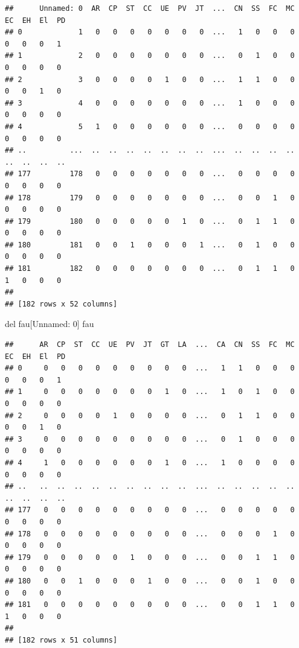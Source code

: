 \documentclass[
  10pt,
]{article}
\newenvironment{Shaded}{\begin{snugshade}}{\end{snugshade}}
\newcommand{\NormalTok}[1]{#1}
\begin{document}
\begin{verbatim}
##      Unnamed: 0  AR  CP  ST  CC  UE  PV  JT  ...  CN  SS  FC  MC  EC  EH  El  PD
## 0             1   0   0   0   0   0   0   0  ...   1   0   0   0   0   0   0   1
## 1             2   0   0   0   0   0   0   0  ...   0   1   0   0   0   0   0   0
## 2             3   0   0   0   0   1   0   0  ...   1   1   0   0   0   0   1   0
## 3             4   0   0   0   0   0   0   0  ...   1   0   0   0   0   0   0   0
## 4             5   1   0   0   0   0   0   0  ...   0   0   0   0   0   0   0   0
## ..          ...  ..  ..  ..  ..  ..  ..  ..  ...  ..  ..  ..  ..  ..  ..  ..  ..
## 177         178   0   0   0   0   0   0   0  ...   0   0   0   0   0   0   0   0
## 178         179   0   0   0   0   0   0   0  ...   0   0   1   0   0   0   0   0
## 179         180   0   0   0   0   0   1   0  ...   0   1   1   0   0   0   0   0
## 180         181   0   0   1   0   0   0   1  ...   0   1   0   0   0   0   0   0
## 181         182   0   0   0   0   0   0   0  ...   0   1   1   0   1   0   0   0
## 
## [182 rows x 52 columns]
\end{verbatim}

\begin{Shaded}
\begin{Highlighting}[]
\NormalTok{del fau[\textquotesingle{}Unnamed: 0\textquotesingle{}]}
\NormalTok{fau}
\end{Highlighting}
\end{Shaded}

\begin{verbatim}
##      AR  CP  ST  CC  UE  PV  JT  GT  LA  ...  CA  CN  SS  FC  MC  EC  EH  El  PD
## 0     0   0   0   0   0   0   0   0   0  ...   1   1   0   0   0   0   0   0   1
## 1     0   0   0   0   0   0   0   1   0  ...   1   0   1   0   0   0   0   0   0
## 2     0   0   0   0   1   0   0   0   0  ...   0   1   1   0   0   0   0   1   0
## 3     0   0   0   0   0   0   0   0   0  ...   0   1   0   0   0   0   0   0   0
## 4     1   0   0   0   0   0   0   1   0  ...   1   0   0   0   0   0   0   0   0
## ..   ..  ..  ..  ..  ..  ..  ..  ..  ..  ...  ..  ..  ..  ..  ..  ..  ..  ..  ..
## 177   0   0   0   0   0   0   0   0   0  ...   0   0   0   0   0   0   0   0   0
## 178   0   0   0   0   0   0   0   0   0  ...   0   0   0   1   0   0   0   0   0
## 179   0   0   0   0   0   1   0   0   0  ...   0   0   1   1   0   0   0   0   0
## 180   0   0   1   0   0   0   1   0   0  ...   0   0   1   0   0   0   0   0   0
## 181   0   0   0   0   0   0   0   0   0  ...   0   0   1   1   0   1   0   0   0
## 
## [182 rows x 51 columns]
\end{verbatim}
\end{document}
